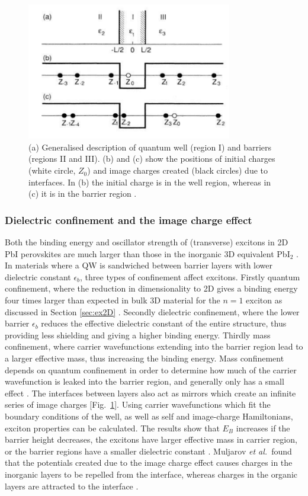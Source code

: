 \begin{figure}[h!]
\centering
\includegraphics[width=0.8\textwidth]{Fig17}
\caption{(a) Generalised description of quantum well (region I) and barriers (regions II and III). (b) and (c) show the positions of initial charges (white circle, $Z_0$) and image charges created (black circles) due to interfaces. In (b) the initial charge is in the well region, whereas in (c) it is in the barrier region \cite{Kumagai1989}.}
\label{2Fig17}
\end{figure}
\subsubsection{Dielectric confinement and the image charge effect}
\label{sec:confinement}
Both the binding energy and oscillator strength of (transverse) excitons in 2D PbI perovskites are much larger than those in the inorganic 3D equivalent Pb$\textrm{I}_2$ \cite{Hirasawa1994}. In materials where a QW is sandwiched between barrier layers with lower dielectric constant $\epsilon_b$, three types of confinement affect excitons. Firstly quantum confinement, where the reduction in dimensionality to 2D gives a binding energy four times larger than expected in bulk 3D material for the $n=1$ exciton as discussed in Section \ref{sec:ex2D} \cite{Shinada1966}. Secondly dielectric confinement, where the lower barrier $\epsilon_b$ reduces the effective dielectric constant of the entire structure, thus providing less shielding and giving a higher binding energy. Thirdly mass confinement, where carrier wavefunctions extending into the barrier region lead to a larger effective mass, thus increasing the binding energy. Mass confinement depends on quantum confinement in order to determine how much of the carrier wavefunction is leaked into the barrier region, and generally only has a small effect \cite{Kumagai1989}. The interfaces between layers also act as mirrors which create an infinite series of image charges [Fig.\ \ref{2Fig17}]. Using carrier wavefunctions which fit the boundary conditions of the well, as well as self and image-charge Hamiltonians, exciton properties can be calculated. The results show that $E_B$ increases if the barrier height decreases, the excitons have larger effective mass in carrier region, or the barrier regions have a smaller dielectric constant \cite{Kumagai1989}. Muljarov \textit{et al.}\ found that the potentials created due to the image charge effect causes charges in the inorganic layers to be repelled from the interface, whereas charges in the organic layers are attracted to the interface \cite{Muljarov1995}.


